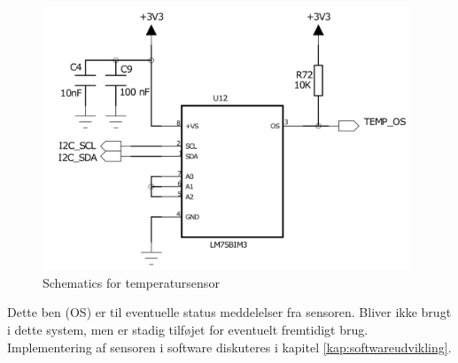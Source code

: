 \begin{figure}[h]
	\centering
	\includegraphics[width=11cm]{billeder/temp_sensor_sch.png}
	\caption{Schematics for temperatursensor}
	\label{fig:temp_sensor}
\end{figure}

Dette ben (OS) er til eventuelle status meddelelser fra sensoren. Bliver ikke brugt i dette system, men er stadig tilføjet for eventuelt fremtidigt brug. Implementering af sensoren i software diskuteres i kapitel \ref{kap:softwareudvikling}.


